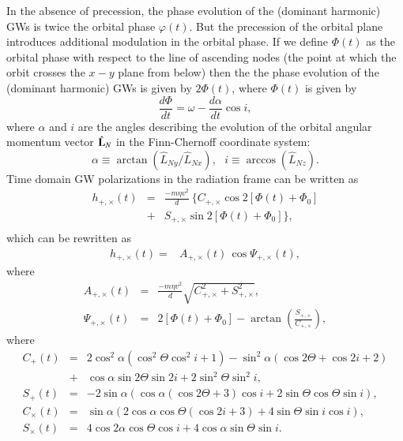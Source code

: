 \documentclass[prd,preprintnumbers,twocolumn,eqsecnum,floatfix,letter]{revtex4}
\begin{document}
In the absence of precession, the phase evolution of the (dominant harmonic) GWs is twice the orbital phase $\varphi(t)$. But the precession of the orbital plane introduces additional modulation in the orbital phase. If we define $\Phi(t)$ as the orbital phase with respect to the line of ascending nodes (the point at which the orbit crosses the $x-y$ plane from below) then the the phase evolution of the (dominant harmonic) GWs is given by $2\Phi(t)$, where $\Phi(t)$ is given by 
%
\begin{equation}
\label{eq:dPhiByDt}
\frac{d\Phi}{dt} = \omega - \frac{d\alpha}{dt} \cos i, 
\end{equation}
%
where $\alpha$ and $i$ are the angles describing the evolution of the orbital angular momentum vector $\hat{\mathbf{L}}_N$ in the Finn-Chernoff coordinate system:
%
\begin{equation}
\alpha \equiv \arctan (\hat{L}_{Ny}/\hat{L}_{Nx}), ~~~ i \equiv \arccos (\hat{L}_{Nz}). 
\end{equation}
%
Time domain GW polarizations in the radiation frame can be written as 
%
\begin{eqnarray}
\label{eq:polzns_timedom}
h_{+,\times}(t) & = & \frac{-m \eta v^2}{d} ~\Bigg\{ C_{+,\times}\cos 2[\Phi(t)+\Phi_{0}] \nonumber \\ 
 & + & S_{+,\times}\sin 2[\Phi(t)+\Phi_{0}] \Bigg\}, \nonumber \\ 
\end{eqnarray} 
% 
which can be rewritten as 
%
\begin{eqnarray}
h_{+,\times}(t) = & A_{+,\times}(t) \, \cos \Psi_{+,\times}(t),
\end{eqnarray} 
%
where 
\begin{eqnarray}
\label{eq:polz_timedom_ampphase}
A_{+,\times}(t) & = & \frac{-m \eta v^2}{d} \sqrt{C_{+,\times}^2 + S_{+,\times}^2}, \nonumber \\ 
\Psi_{+,\times}(t) & = & 2 [\Phi(t) + \Phi_0] - \arctan \left(\frac{S_{+,\times}}{C_{+,\times}} \right),
\end{eqnarray}
where 
\begin{eqnarray}
C_+(t) & = & 2 \cos^2\alpha (\cos^2\Theta \cos^2 i+1)
	 -  \sin^2\alpha (\cos 2\Theta+\cos 2i+2) \nonumber \\ 
	& + & \cos \alpha \sin 2\Theta \sin 2i+2 \sin^2 \Theta \sin^2 i , \nonumber \\ 
S_+(t) & = & -2 \sin\alpha (\cos\alpha (\cos 2\Theta+3) \cos i + 2 \sin\Theta \cos\Theta \sin i), \nonumber \\ 
C_\times(t) & = & \sin \alpha (2 \cos \alpha \cos \Theta (\cos 2i+3)+4 \sin \Theta \sin i \cos i), \nonumber \\ 
S_\times(t) & = & 4 \cos 2\alpha \cos \Theta \cos i+ 4 \cos \alpha \sin \Theta \sin i.
\end{eqnarray}
\end{document}
